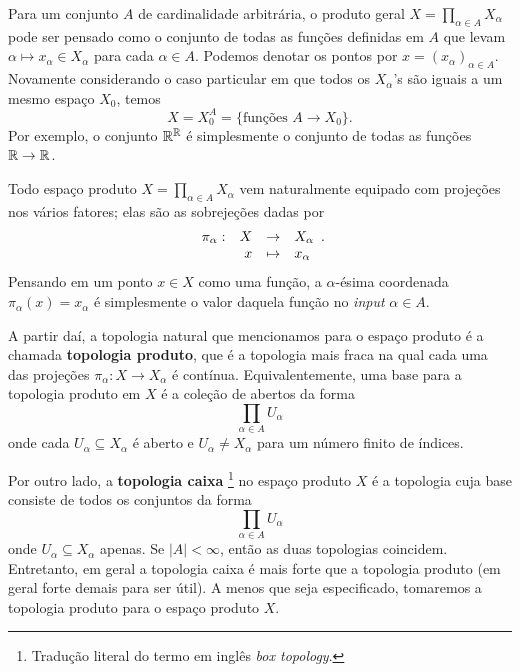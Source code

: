  Para um conjunto $A$ de cardinalidade arbitrária,
 o produto geral
 $X = \displaystyle{ \prod_{\alpha \in A} X_{\alpha} }$
 pode ser pensado como o conjunto de todas as funções definidas em
 $A$
 que levam
 $\alpha \mapsto x_{\alpha} \in X_{\alpha}$
 para cada
 $\alpha \in A.$
 Podemos denotar os pontos por 
 $x = (x_{\alpha})_{\alpha \in A}$.
 Novamente considerando o caso particular em que todos os
 $X_{\alpha}$'s
 são iguais a um mesmo espaço
 $X_0$,
 temos
 \begin{equation*}
     X
     =
     X_0^A
     =
     \{ \text{funções } A \to X_0 \}.
 \end{equation*}
 Por exemplo, o conjunto
 $\mathbb{R}^{\mathbb{R}}$
 é simplesmente o conjunto de todas as funções
 $\mathbb{R} \to \mathbb{R}$.
 
 Todo espaço produto
 $X = \displaystyle{ \prod_{\alpha \in A} X_{\alpha} }$
 vem naturalmente equipado com projeções nos vários fatores;
 elas são as sobrejeções dadas por
 \begin{equation*}
     {\begin{array}[t]{lrcl} \pi_{\alpha}:& X &\to &X_{\alpha} \\ & x &\mapsto &x_{\alpha} \end{array}}.
 \end{equation*}
 Pensando em um ponto
 $x \in X$
 como uma função, a $\alpha$-ésima coordenada
 $\pi_{\alpha}(x) = x_{\alpha}$
 é simplesmente o valor daquela função no \textit{input}
 $\alpha \in A$.
 
 A partir daí, a topologia natural que mencionamos para o espaço produto
 é a chamada \textbf{topologia produto}, que é a topologia mais fraca
 na qual cada uma das projeções
 $\pi_{\alpha} : X \to X_{\alpha}$
 é contínua. 
 Equivalentemente, uma base para a topologia produto em 
 $X$
 é a coleção de abertos da forma
 \begin{equation*}
     \prod_{\alpha \in A} U_{\alpha}
 \end{equation*}
 onde cada
 $U_{\alpha} \subseteq X_{\alpha}$
 é aberto e
 $U_{\alpha} \neq X_{\alpha}$
 para um número finito de índices.
 
 Por outro lado, a \textbf{topologia caixa}
 \footnote{Tradução literal do termo em inglês \textit{box topology}.}
 no espaço produto 
 $X$
 é a topologia cuja base consiste de todos os conjuntos da forma
 \begin{equation*}
     \prod_{\alpha \in A} U_{\alpha}
 \end{equation*}
 onde
 $U_{\alpha} \subseteq X_{\alpha}$
 apenas.
 Se $|A| < \infty$, então as duas topologias coincidem.
 Entretanto, em geral a topologia caixa é mais forte que a topologia produto
 (em geral forte demais para ser útil).
 A menos que seja especificado, 
 tomaremos a topologia produto para o espaço produto $X$.
 
